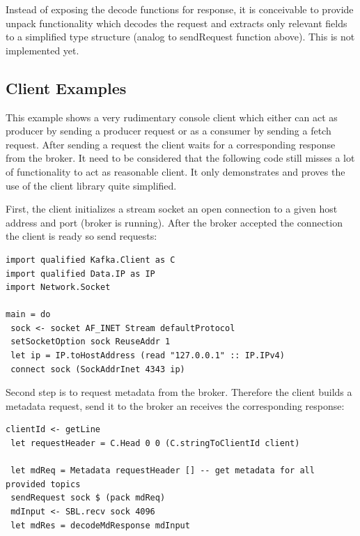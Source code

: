 Instead of exposing the decode functions for response, it is conceivable to
provide unpack functionality which decodes the request and extracts only relevant
fields to a simplified type structure (analog to sendRequest function above).
This is not implemented yet.

\subsection{Client Examples}
This example shows a very rudimentary console client which either can act as producer
by sending a producer request or as a consumer by sending a fetch request. After
sending a request the client waits for a corresponding response from the broker.
It need to be considered that the following code still misses a lot of functionality to
act as reasonable client. It only demonstrates and proves the use of the client library quite
simplified.

First, the client initializes a stream socket an open connection to a given host
address and port (broker is running). After the broker accepted the connection
the client is ready so send requests:
\begin{lstlisting}[caption={Initialize client by connceting to broker}]
import qualified Kafka.Client as C 
import qualified Data.IP as IP
import Network.Socket

main = do 
 sock <- socket AF_INET Stream defaultProtocol 
 setSocketOption sock ReuseAddr 1
 let ip = IP.toHostAddress (read "127.0.0.1" :: IP.IPv4)
 connect sock (SockAddrInet 4343 ip)
\end{lstlisting}

Second step is to request metadata from the broker.
Therefore the client builds a metadata request, send it to the broker an receives the
corresponding response:
\begin{lstlisting}[caption={Retrieve metadata from broker}]
 clientId <- getLine
 let requestHeader = C.Head 0 0 (C.stringToClientId client)

 let mdReq = Metadata requestHeader [] -- get metadata for all provided topics
 sendRequest sock $ (pack mdReq)
 mdInput <- SBL.recv sock 4096
 let mdRes = decodeMdResponse mdInput
\end{lstlisting}

